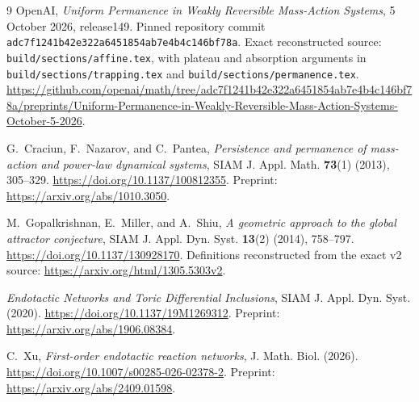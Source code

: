 \documentclass[11pt]{article}
\theoremstyle{definition}
\theoremstyle{remark}
\numberwithin{equation}{section}
\begin{document}
\begin{thebibliography}{9}
OpenAI, \emph{Uniform Permanence in Weakly Reversible
Mass-Action Systems}, 5 October 2026, release149.
Pinned repository commit
\texttt{adc7f1241b42e322a6451854ab7e4b4c146bf78a}.
Exact reconstructed source: \texttt{build/sections/affine.tex},
with plateau and absorption arguments in
\texttt{build/sections/trapping.tex} and
\texttt{build/sections/permanence.tex}.
\url{https://github.com/openai/math/tree/adc7f1241b42e322a6451854ab7e4b4c146bf78a/preprints/Uniform-Permanence-in-Weakly-Reversible-Mass-Action-Systems-October-5-2026}.

G.~Craciun, F.~Nazarov, and C.~Pantea,
\emph{Persistence and permanence of mass-action and
power-law dynamical systems}, SIAM J. Appl. Math.
\textbf{73}(1) (2013), 305--329.
\url{https://doi.org/10.1137/100812355}.
Preprint: \url{https://arxiv.org/abs/1010.3050}.

M.~Gopalkrishnan, E.~Miller, and A.~Shiu,
\emph{A geometric approach to the global attractor
conjecture}, SIAM J. Appl. Dyn. Syst. \textbf{13}(2)
(2014), 758--797.
\url{https://doi.org/10.1137/130928170}.
Definitions reconstructed from the exact v2 source:
\url{https://arxiv.org/html/1305.5303v2}.

\emph{Endotactic Networks and Toric Differential Inclusions},
SIAM J. Appl. Dyn. Syst. (2020).
\url{https://doi.org/10.1137/19M1269312}.
Preprint: \url{https://arxiv.org/abs/1906.08384}.

C.~Xu, \emph{First-order endotactic reaction networks},
J. Math. Biol. (2026).
\url{https://doi.org/10.1007/s00285-026-02378-2}.
Preprint: \url{https://arxiv.org/abs/2409.01598}.
\end{thebibliography}
\end{document}
